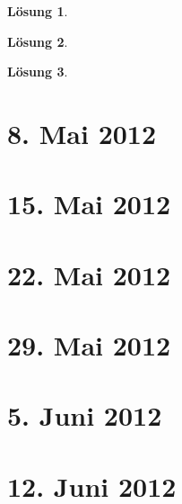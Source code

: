 \documentclass[a4paper,12pt]{report}
\theoremstyle{break}
\newtheorem{Loes}{L\"osung}
\theoremstyle{nonumberbreak}
\theoremstyle{nonumberplain}
\begin{document}
\begin{Loes}

\end{Loes}

\begin{Loes}

\end{Loes}

\begin{Loes}

\end{Loes}

\newpage
\section{8. Mai 2012}
\setcounter{Aufg}{0}
\setcounter{Loes}{0}

\newpage
\section{15. Mai 2012}
\setcounter{Aufg}{0}
\setcounter{Loes}{0}

\newpage
\section{22. Mai 2012}
\setcounter{Aufg}{0}
\setcounter{Loes}{0}

\newpage
\section{29. Mai 2012}
\setcounter{Aufg}{0}
\setcounter{Loes}{0}

\newpage
\section{5. Juni 2012}
\setcounter{Aufg}{0}
\setcounter{Loes}{0}

\newpage
\section{12. Juni 2012}
\setcounter{Aufg}{0}
\setcounter{Loes}{0}

\newpage
\end{document}
